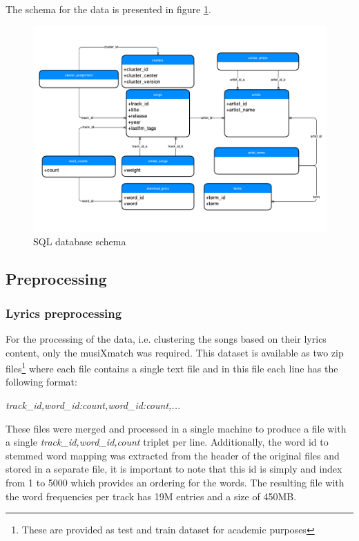 \documentclass[10pt,a4paper]{scrartcl}
\begin{document}
    The schema for the data is presented in figure \ref{fig:data_schema}.
 
    \begin{figure}
      \centering
      \includegraphics[scale=0.6]{img/database}
      \caption{SQL database schema}
      \label{fig:data_schema}
    \end{figure}        

    \subsection{Preprocessing}
    \subsubsection{Lyrics preprocessing}
    \label{sec:preprocessing}

    For the processing of the data, i.e. clustering the songs based on their
    lyrics content, only the musiXmatch was required. This dataset is available
    as two zip files\footnote{These are provided as test and train dataset for
    academic purposes} where each file contains a single text file and in this
    file each line has the following format:
    
    \emph{track\_id,word\_id:count,word\_id:count,...}
    
    These files were merged and processed in a single machine to produce a file
    with a single 
    \emph{track\_id,word\_id,count} triplet per line. Additionally, the word id
    to stemmed word mapping was extracted from the header of the original files
    and stored in a separate file, it is important to note that this id is simply
    and index from 1 to 5000 which provides an ordering for the words.
    The resulting file with the word frequencies per track has 19M entries and a
    size of 450MB.
    
\end{document}
